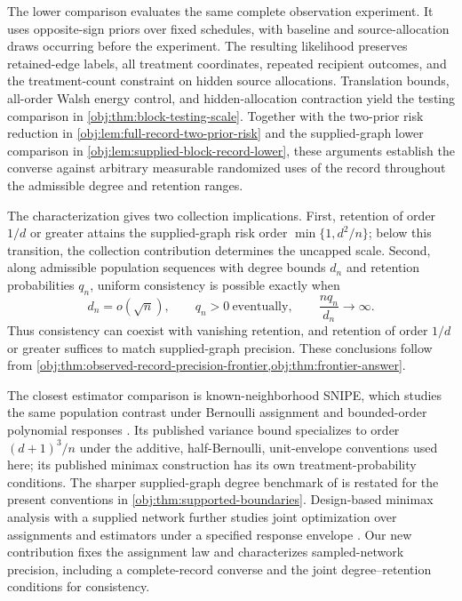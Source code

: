 \documentclass[11pt]{article}
\begin{document}
The lower comparison evaluates the same complete observation experiment. It uses opposite-sign priors over fixed schedules, with baseline and source-allocation draws occurring before the experiment. The resulting likelihood preserves retained-edge labels, all treatment coordinates, repeated recipient outcomes, and the treatment-count constraint on hidden source allocations. Translation bounds, all-order Walsh energy control, and hidden-allocation contraction yield the testing comparison in \cref{obj:thm:block-testing-scale}. Together with the two-prior risk reduction in \cref{obj:lem:full-record-two-prior-risk} and the supplied-graph lower comparison in \cref{obj:lem:supplied-block-record-lower}, these arguments establish the converse against arbitrary measurable randomized uses of the record throughout the admissible degree and retention ranges.

The characterization gives two collection implications. First, retention of order \(1/d\) or greater attains the supplied-graph risk order \(\min\{1,d^2/n\}\); below this transition, the collection contribution determines the uncapped scale. Second, along admissible population sequences with degree bounds \(d_n\) and retention probabilities \(q_n\), uniform consistency is possible exactly when
\[
d_n=o(\sqrt n),
\qquad
q_n>0\ \text{eventually},
\qquad
\frac{nq_n}{d_n}\longrightarrow\infty.
\]
Thus consistency can coexist with vanishing retention, and retention of order \(1/d\) or greater suffices to match supplied-graph precision. These conclusions follow from \cref{obj:thm:observed-record-precision-frontier,obj:thm:frontier-answer}.

The closest estimator comparison is known-neighborhood SNIPE, which studies the same population contrast under Bernoulli assignment and bounded-order polynomial responses \citep[Sections 3--5; Theorems 1--2]{CortezRodriguezEichhornYu2023SNIPE}. Its published variance bound specializes to order \((d+1)^3/n\) under the additive, half-Bernoulli, unit-envelope conventions used here; its published minimax construction has its own treatment-probability conditions. The sharper supplied-graph degree benchmark of \citet[Theorem \texttt{thm:degree-frontier}; non-archival research note]{CausalSmithKnownGraph2026} is restated for the present conventions in \cref{obj:thm:supported-boundaries}. Design-based minimax analysis with a supplied network further studies joint optimization over assignments and estimators under a specified response envelope \citep[Corollary 5.4]{KandirosHarshawSavje2026DesignBasedMinimax}. Our new contribution fixes the assignment law and characterizes sampled-network precision, including a complete-record converse and the joint degree--retention conditions for consistency.
\end{document}
